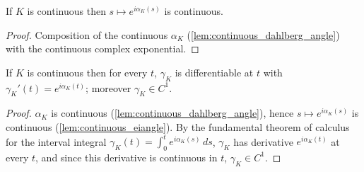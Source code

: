 \begin{lemma}


  \label{lem:continuous_eiangle}
  If $K$ is continuous then $s\mapsto e^{i\alpha_K(s)}$ is continuous.
\end{lemma}
\begin{proof}
  \leanok
  Composition of the continuous $\alpha_K$ (\cref{lem:continuous_dahlberg_angle})
  with the continuous complex exponential.
\end{proof}

\begin{lemma}


  \label{lem:hasderivat_dahlberg_curve}
  If $K$ is continuous then for every $t$, $\gamma_K$ is differentiable at $t$
  with $\gamma_K'(t)=e^{i\alpha_K(t)}$; moreover $\gamma_K\in C^1$.
\end{lemma}
\begin{proof}
  \leanok
  $\alpha_K$ is continuous (\cref{lem:continuous_dahlberg_angle}), hence
  $s\mapsto e^{i\alpha_K(s)}$ is continuous (\cref{lem:continuous_eiangle}).
  By the fundamental theorem of calculus for the interval integral
  $\gamma_K(t)=\int_0^t e^{i\alpha_K(s)}\,ds$, $\gamma_K$ has derivative
  $e^{i\alpha_K(t)}$ at every $t$, and since this derivative is continuous in $t$,
  $\gamma_K\in C^1$.
\end{proof}

